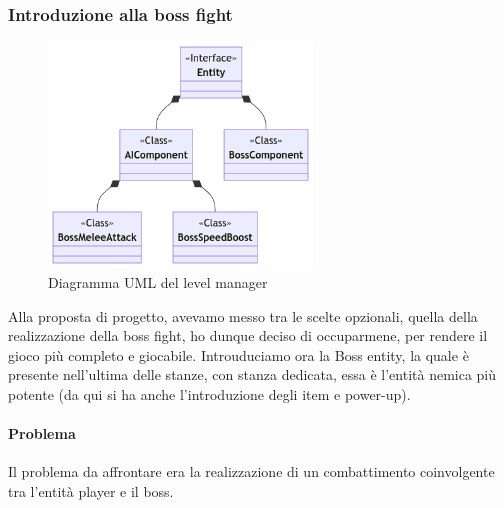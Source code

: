 \documentclass[a4paper,12pt]{report}
\begin{document}
\subsubsection*{Introduzione alla boss fight}

\begin{figure}[h]
	\centering
	\includegraphics[width=7cm]{uml/BossEntity1.png}
	\caption{Diagramma UML del level manager}
\end{figure}

Alla proposta di progetto, avevamo messo tra le scelte opzionali, quella della realizzazione della boss fight, ho dunque deciso di occuparmene, per rendere il gioco più completo e giocabile.
Introuduciamo ora la Boss entity, la quale è presente nell'ultima delle stanze, con stanza dedicata, essa è l'entità nemica più potente (da qui si ha anche l'introduzione degli item e power-up). 
\paragraph*{Problema}
Il problema da affrontare era la realizzazione di un combattimento coinvolgente tra l'entità player e il boss.
\end{document}
